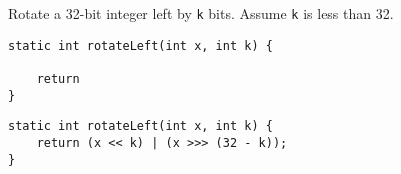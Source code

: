 \question Rotate a 32-bit integer left by \texttt{k} bits. Assume \texttt{k} is less than 32.

\ifprintanswers\else
\begin{lstlisting}
static int rotateLeft(int x, int k) {

    return
}
\end{lstlisting}
\fi

\begin{solution}
\begin{lstlisting}
static int rotateLeft(int x, int k) {
    return (x << k) | (x >>> (32 - k));
}
\end{lstlisting}
\end{solution}
